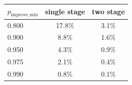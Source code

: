 \begin{tabular}{lcc}\toprule
$p_{\mathrm{improve\_min}}$ & single stage & two stage \\\midrule
0.800 & 17.8\% & 3.1\% \\
0.900 & 8.8\% & 1.6\% \\
0.950 & 4.3\% & 0.9\% \\
0.975 & 2.1\% & 0.4\% \\
0.990 & 0.8\% & 0.1\% \\
\bottomrule\end{tabular}